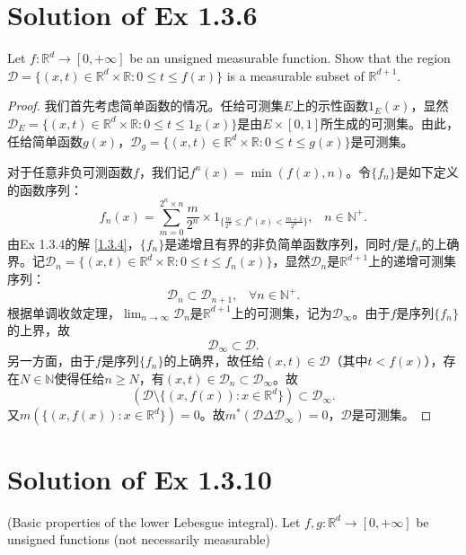 \documentclass[reqno,a4paper,10pt]{amsart}
\newcommand\Rnum{\mathbb{R}}
\begin{document}
\section{Solution of Ex 1.3.6}\label{1.3.6}
Let $f: \mathbb{R}^d\to [0,+\infty]$ be an unsigned measurable function. Show that the region $\mathcal{D}=\{(x,t)\in \mathbb{R}^d\times \mathbb{R} : 0\leq t\leq f(x)\}$ is a measurable subset of $\mathbb{R}^{d+1}$. 
\begin{proof}
    我们首先考虑简单函数的情况。任给可测集$E$上的示性函数$1_{E}(x)$，显然$\mathcal{D}_{E}=\{(x,t)\in \mathbb{R}^d\times \mathbb{R} : 0\leq t\leq 1_E(x)\}$是由$E\times [0,1]$所生成的可测集。由此，任给简单函数$g(x)$，$\mathcal{D}_{g}=\{(x,t)\in \mathbb{R}^d\times \mathbb{R} : 0\leq t\leq g(x)\}$是可测集。
    
    对于任意非负可测函数$f$，我们记$f^n(x)=\min (f(x),n)$。令$\{f_n\}$是如下定义的函数序列：
    \begin{equation*}
        f_n(x)=\sum_{m=0}^{2^n\times n} \frac{m}{2^n}\times 1_{\{\frac{m}{2^n}\leq f^n(x)<\frac{m+1}{2^n}\}},\;\;\; n\in\mathbb{N}^+.
    \end{equation*}
    由Ex 1.3.4的解 \ref{1.3.4}，$\{f_n\}$是递增且有界的非负简单函数序列，同时$f$是$f_n$的上确界。记$\mathcal{D}_n=\{(x,t)\in \mathbb{R}^d\times \mathbb{R} : 0\leq t\leq f_n(x)\}$，显然$\mathcal{D}_n$是$\Rnum^{d+1}$上的递增可测集序列：
    \begin{equation*}
        \mathcal{D}_n\subset \mathcal{D}_{n+1},\;\;\; \forall n\in\mathbb{N}^+.
    \end{equation*}
    根据单调收敛定理，$\lim_{n\to\infty}\mathcal{D}_{n}$是$\Rnum^{d+1}$上的可测集，记为$\mathcal{D}_{\infty}$。由于$f$是序列$\{f_n\}$的上界，故
    \begin{equation*}
        \mathcal{D}_{\infty}\subset \mathcal{D}.
    \end{equation*}
    另一方面，由于$f$是序列$\{f_n\}$的上确界，故任给$(x,t)\in\mathcal{D}$（其中$t<f(x)$），存在$N\in\mathbb{N}$使得任给$n\geq N$，有$(x,t)\in \mathcal{D}_n\subset\mathcal{D}_{\infty}$。故
    \begin{equation*}
        (\mathcal{D}\setminus\{(x,f(x)):x\in\Rnum^d\})\subset \mathcal{D}_\infty.
    \end{equation*}
    又$m(\{(x,f(x)):x\in\Rnum^d\})=0$。故$m^*(\mathcal{D}\Delta \mathcal{D}_\infty)=0$，$\mathcal{D}$是可测集。
\end{proof}


\section{Solution of Ex 1.3.10}
(Basic properties of the lower Lebesgue integral). Let $f,g:\Rnum^d\to [0,+\infty]$ be unsigned functions (not necessarily measurable)
\end{document}
